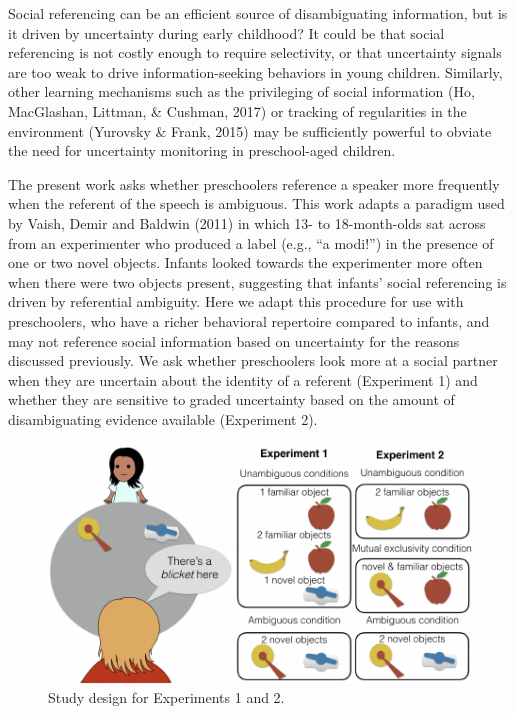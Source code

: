 \documentclass[10pt, letterpaper]{article}
\newenvironment{CodeChunk}{}{}
\begin{document}
Social referencing can be an efficient source of disambiguating
information, but is it driven by uncertainty during early childhood? It
could be that social referencing is not costly enough to require
selectivity, or that uncertainty signals are too weak to drive
information-seeking behaviors in young children. Similarly, other
learning mechanisms such as the privileging of social information (Ho,
MacGlashan, Littman, \& Cushman, 2017) or tracking of regularities in
the environment (Yurovsky \& Frank, 2015) may be sufficiently powerful
to obviate the need for uncertainty monitoring in preschool-aged
children.

The present work asks whether preschoolers reference a speaker more
frequently when the referent of the speech is ambiguous. This work
adapts a paradigm used by Vaish, Demir and Baldwin (2011) in which 13-
to 18-month-olds sat across from an experimenter who produced a label
(e.g., ``a modi!'') in the presence of one or two novel objects. Infants
looked towards the experimenter more often when there were two objects
present, suggesting that infants' social referencing is driven by
referential ambiguity. Here we adapt this procedure for use with
preschoolers, who have a richer behavioral repertoire compared to
infants, and may not reference social information based on uncertainty
for the reasons discussed previously. We ask whether preschoolers look
more at a social partner when they are uncertain about the identity of a
referent (Experiment 1) and whether they are sensitive to graded
uncertainty based on the amount of disambiguating evidence available
(Experiment 2).

\begin{CodeChunk}
\captionsetup{width=0.8\columnwidth}\begin{figure}[h]

{\centering \includegraphics{figs/design-1} 

}

\caption[Study design for Experiments 1 and 2]{Study design for Experiments 1 and 2.}\label{fig:design}
\end{figure}
\end{CodeChunk}
\end{document}
